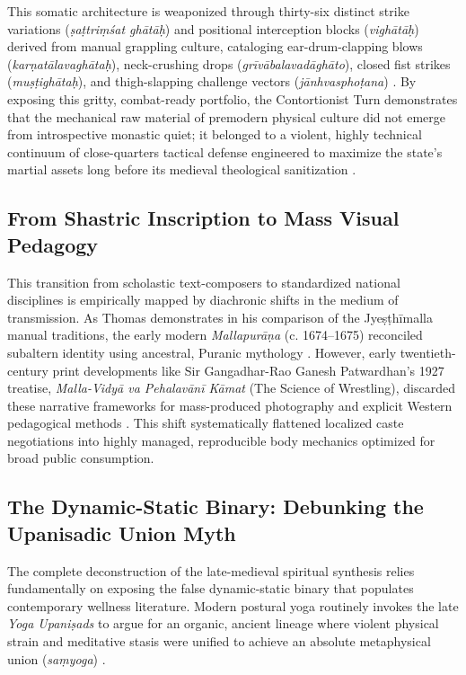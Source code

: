 \documentclass[11pt,twoside,letterpaper]{article}
\begin{document}
This somatic architecture is weaponized through thirty-six distinct strike variations (\textit{\d{s}a\d{t}tri\d{m}\'sat gh\={a}t\={a}\d{h}}) and positional interception blocks (\textit{vigh\={a}t\={a}\d{h}}) derived from manual grappling culture, cataloging ear-drum-clapping blows (\textit{kar\d{n}at\={a}lavagh\={a}ta\d{h}}), neck-crushing drops (\textit{gr\={i}v\={a}balavad\={a}gh\={a}to}), closed fist strikes (\textit{mu\d{s}\d{t}igh\={a}ta\d{h}}), and thigh-slapping challenge vectors (\textit{j\={a}nhvaspho\d{t}ana}) \citep{MP_7_v42, OHanlon2007}. By exposing this gritty, combat-ready portfolio, the Contortionist Turn demonstrates that the mechanical raw material of premodern physical culture did not emerge from introspective monastic quiet; it belonged to a violent, highly technical continuum of close-quarters tactical defense engineered to maximize the state's martial assets long before its medieval theological sanitization \citep{MP_7_v43, Wujastyk2025}.


\subsection{From Shastric Inscription to Mass Visual Pedagogy}
This transition from scholastic text-composers to standardized national disciplines is empirically mapped by diachronic shifts in the medium of transmission. As Thomas demonstrates in his comparison of the Jye\d{s}\d{t}h\={i}malla manual traditions, the early modern \textit{Mallapur\={a}\d{n}a} (c. 1674–1675) reconciled subaltern identity using ancestral, Puranic mythology \citep{Thomas2025}. However, early twentieth-century print developments like Sir Gangadhar-Rao Ganesh Patwardhan's 1927 treatise, \textit{Malla-Vidy\={a} va Pehalav\={a}n\={i} K\={a}mat} (The Science of Wrestling), discarded these narrative frameworks for mass-produced photography and explicit Western pedagogical methods \citep{Patwardhan1927, Thomas2025}. This shift systematically flattened localized caste negotiations into highly managed, reproducible body mechanics optimized for broad public consumption.

\subsection{The Dynamic-Static Binary: Debunking the Upanisadic Union Myth}
The complete deconstruction of the late-medieval spiritual synthesis relies fundamentally on exposing the false dynamic-static binary that populates contemporary wellness literature. Modern postural yoga routinely invokes the late \textit{Yoga Upani\d{s}ads} to argue for an organic, ancient lineage where violent physical strain and meditative stasis were unified to achieve an absolute metaphysical union (\textit{sa\d{m}yoga}) \citep{Bouy1994}. 
\end{document}
